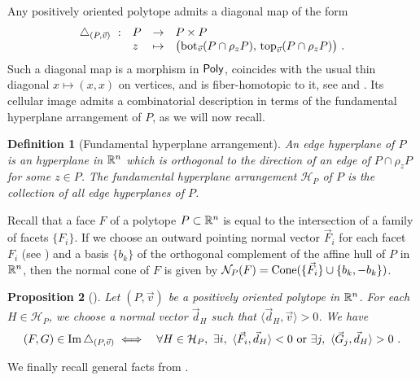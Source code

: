 \documentclass[twoside, 11pt]{amsart}
\newtheorem{definition}{Definition}[section]
\newtheorem{proposition}[definition]{Proposition}
\theoremstyle{remark}
\begin{document}
Any positively oriented polytope admits a diagonal map of the form
\begin{align*}
\begin{array}{rlcl}
\triangle_{(P,\vec v)}\  : & P &\to  &P \times P\\
&z & \mapsto& 
\bigl(\operatorname{bot}_{\vec v}(P\cap \rho_zP),\,  \operatorname{top}_{\vec v}(P\cap \rho_z P)\bigr) \ .
\end{array}
\end{align*}
Such a diagonal map is a morphism in $\mathsf{Poly}$, coincides with the usual thin diagonal $x\mapsto (x, x)$ on vertices, and is fiber-homotopic to it, see \cite[Proposition~5]{MTTV19} and \cite[Proposition 1.1]{LA21}.
Its cellular image admits a combinatorial description in terms of the fundamental hyperplane arrangement of $P$, as we will now recall.

\begin{definition}[Fundamental hyperplane arrangement]
  \label{def:fundamentalhyperplane} 
  An \emph{edge hyperplane} of $P$ is an hyperplane in $\mathbb{R}^n$ which is orthogonal to the direction of an edge of $P\cap\rho_z P$ for some $z \in P$.
  The \emph{fundamental hyperplane arrangement} $\mathcal{H}_P$ of $P$ is the collection of all edge hyperplanes of $P$. 
\end{definition}

Recall that a face $F$ of a polytope $P \subset \mathbb{R}^n$ is equal to the intersection of a family of facets $\{F_i\}$. 
If we choose an outward pointing normal vector $\vec F_i$ for each facet $F_i$ (see \cite[Definition 1.24]{LA21}) and a basis $\{b_k\}$ of the orthogonal complement of the affine hull of $P$ in $\mathbb{R}^n$, then the normal cone of $F$ is given by $\mathcal{N}_P(F)=\operatorname{Cone}(\{\vec F_i\} \cup \{b_k,-b_k\})$. 

\begin{proposition}[{\cite[Theorem 1.23]{LA21}}]
  \label{thm:universalformula} 
  Let $(P,\vec v)$ be a positively oriented polytope in $\mathbb{R}^n$. For each $H\in\mathcal{H}_P$, we choose a normal vector $\vec d_H$ such that $\langle \vec d_H, \vec v \rangle >0$. We have 
\begin{eqnarray*}
  (F,G) \in \operatorname{Im} \triangle_{(P,\vec v)} 
  &\iff&  \forall H \in \mathcal{H}_P , \ \exists i , \ \langle \vec F_i, \vec d_H \rangle < 0  \text{ or } \exists j , \ \langle \vec G_j, \vec d_H \rangle > 0 \ . 
\end{eqnarray*} 
\end{proposition}

We finally recall general facts from \cite[Section 1.6]{LA21}. 
\end{document}
